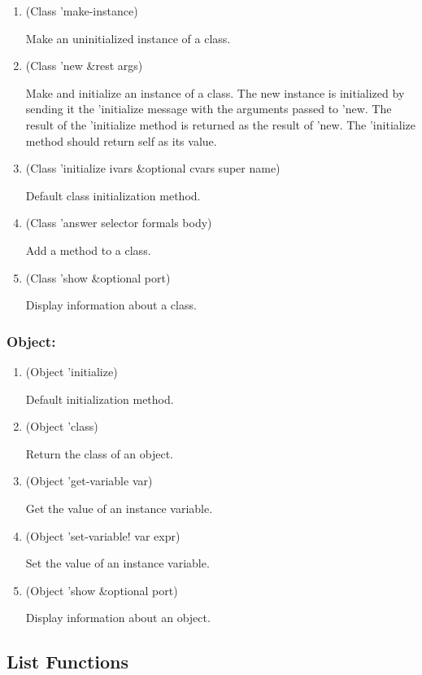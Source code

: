 \documentclass[11pt]{article}
\begin{document}
\begin{enumerate}
\item (Class 'make-instance)
\label{sec-4-12-1-1}

Make an uninitialized instance of a class.
\item (Class 'new \&rest args)
\label{sec-4-12-1-2}

Make and initialize an instance of a class.  The new instance is
initialized by sending it the 'initialize message with the arguments
passed to 'new.  The result of the 'initialize method is returned as
the result of 'new.  The 'initialize method should return self as
its value.
\item (Class 'initialize ivars \&optional cvars super name)
\label{sec-4-12-1-3}

Default class initialization method.
\item (Class 'answer selector formals body)
\label{sec-4-12-1-4}

Add a method to a class.
\item (Class 'show \&optional port)
\label{sec-4-12-1-5}

Display information about a class.
\end{enumerate}

\subsubsection{Object:}
\label{sec-4-12-2}

\begin{enumerate}
\item (Object 'initialize)
\label{sec-4-12-2-1}

Default initialization method.
\item (Object 'class)
\label{sec-4-12-2-2}

Return the class of an object.
\item (Object 'get-variable var)
\label{sec-4-12-2-3}

Get the value of an instance variable.
\item (Object 'set-variable! var expr)
\label{sec-4-12-2-4}

Set the value of an instance variable.
\item (Object 'show  \&optional port)
\label{sec-4-12-2-5}

Display information about an object.
\end{enumerate}
\subsection{List Functions}
\label{sec-4-13}
\end{document}
